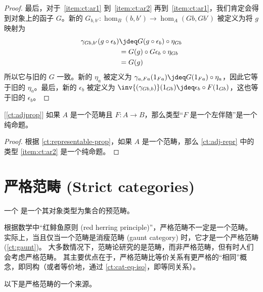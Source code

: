 \begin{proof}
  最后，对于~\ref{item:ct:ar1} 到~\ref{item:ct:ar2} 再到~\ref{item:ct:ar1}，我们肯定会得到对象上的函子 $G$。新的 $G_{b,b'}:\hom_B(b,b') \to \hom_A(Gb,Gb')$ 被定义为将 $g$ 映射为
  \begin{align*}
    \gamma_{G b, b'}(g \circ \epsilon_b)
    &\jdeq G(g \circ \epsilon_b) \circ \eta_{Gb}\\
    &= G(g) \circ G\epsilon_b \circ \eta_{Gb}\\
    &= G(g)
  \end{align*}
  所以它与旧的 $G$ 一致。新的 $\eta_a$ 被定义为 $\gamma_{a,Fa}(1_{Fa}) \jdeq G(1_{Fa}) \circ \eta_a$，因此它等于旧的 $\eta_a$。最后，新的 $\epsilon_b$ 被定义为 $\inv{(\gamma_{Gb,b})}(1_{Gb}) \jdeq \epsilon_b \circ F(1_{Gb})$，这也等于旧的 $\epsilon_b$。
\end{proof}

\begin{cor}\label{ct:adjprop2}[\cref{ct:adjprop}]
如果 $A$ 是一个范畴且 $F:A\to B$，那么类型“$F$ 是一个左伴随”是一个纯命题。
\end{cor}
\begin{proof}
  根据 \cref{ct:representable-prop}，如果 $A$ 是一个范畴，那么 \cref{ct:adj-repr} 中的类型 \ref{item:ct:ar2} 是一个纯命题。
\end{proof}

\section{严格范畴 (Strict categories)}
\label{sec:strict-categories}

%

\begin{defn}\label{ct:strict-category}
一个
%
%
是一个其对象类型为集合的预范畴。
\end{defn}

根据数学中“红鲱鱼原则 (red herring principle)”，严格范畴不一定是一个范畴。
实际上，当且仅当一个范畴是消瘦范畴 (gaunt category) 时，它才是一个严格范畴 (\cref{ct:gaunt})。
%
%
大多数情况下，范畴论研究的是范畴，而非严格范畴，但有时人们会考虑严格范畴。
其主要优点在于，严格范畴比等价关系有更严格的“相同”概念，即同构（或者等价地，通过 \cref{ct:cat-eq-iso}，即等同关系）。

以下是严格范畴的一个来源。

